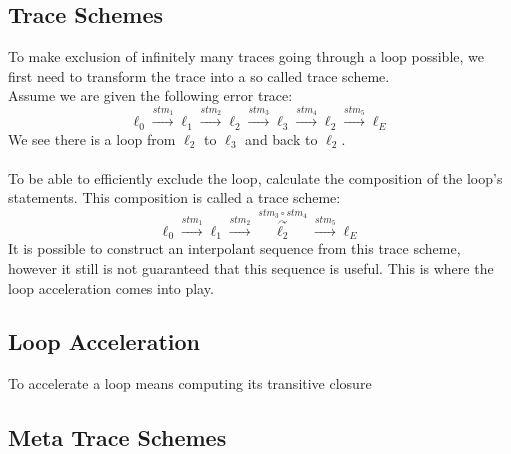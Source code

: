 \documentclass{article}
\begin{document}
\subsection{Trace Schemes}
To make exclusion of infinitely many traces going through a loop possible, we first need to transform the trace into a so called trace scheme. \\
Assume we are given the following error trace:
\begin{equation*}
\ell_0 \xrightarrow{\text{$stm_1$}} \ell_1 \xrightarrow{\text{$stm_2$}} \ell_2 \xrightarrow{\text{$stm_3$}} \ell_3 \xrightarrow{\text{$stm_4$}} \ell_2 \xrightarrow{\text{$stm_5$}} \ell_E
\end{equation*}
We see there is a loop from $\ell_2$ to $\ell_3$ and back to $\ell_2$.  \\ \\
To be able to efficiently exclude the loop, calculate the composition of the loop's statements. This composition is called a trace scheme:
\begin{equation*}
\ell_0 \xrightarrow{\text{$stm_1$}} \ell_1 \xrightarrow{\text{$stm_2$}} \overset{stm_3 \circ stm_4}{\overset{\curvearrowright}{\ell_2}} \xrightarrow{\text{$stm_5$}} \ell_E
\end{equation*}
It is possible to construct an interpolant sequence from this trace scheme, however it still is not guaranteed that this sequence is useful. This is where the loop acceleration comes into play.

\subsection{Loop Acceleration}
To accelerate a loop means computing its transitive closure
\subsection{Meta Trace Schemes}
\end{document}
